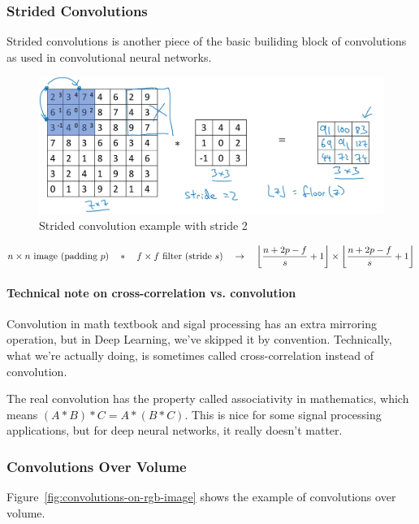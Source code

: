 \documentclass[UTF8]{article}
\DeclarePairedDelimiter\floor{\lfloor}{\rfloor}
\begin{document}
\subsubsection{Strided Convolutions}
Strided convolutions is another piece of the basic builiding block of convolutions as used in
convolutional neural networks.

\begin{figure}[htb]
    \centering
    \includegraphics[width=40em]{figures/strided-convolution}
    \caption{Strided convolution example with stride 2}
    \label{fig:strided-convolution}
\end{figure}

$$ n \times n \text{ image (padding } p \text{)} \quad * \quad f \times f \text{ filter (stride }
s \text{)}  \quad \rightarrow \quad \floor*{\frac{n+2p-f}{s}+1} \times \floor*{\frac{n+2p-f}{s}+1}$$

\paragraph{Technical note on cross-correlation vs. convolution}
Convolution in math textbook and sigal processing has an extra mirroring operation, but in Deep
Learning, we've skipped it by convention. Technically, what we're actually doing, is sometimes
called cross-correlation instead of convolution.

The real convolution has the property called associativity in mathematics, which means $(A * B) * C
= A * (B * C)$. This is nice for some signal processing applications, but for deep neural networks,
it really doesn't matter.

\subsubsection{Convolutions Over Volume}
Figure~\ref{fig:convolutions-on-rgb-image} shows the example of convolutions over volume.
\end{document}
